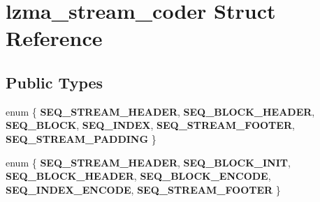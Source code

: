 \section{lzma\+\_\+stream\+\_\+coder Struct Reference}
\label{structlzma__stream__coder}
\subsection*{Public Types}
\begin{DoxyCompactItemize}
\item 
\mbox{\label{structlzma__stream__coder_ae6d6650b05a55ea7f17ca56fd8ce5d46}} 
enum \{ \newline
{\bfseries S\+E\+Q\+\_\+\+S\+T\+R\+E\+A\+M\+\_\+\+H\+E\+A\+D\+ER}, 
{\bfseries S\+E\+Q\+\_\+\+B\+L\+O\+C\+K\+\_\+\+H\+E\+A\+D\+ER}, 
{\bfseries S\+E\+Q\+\_\+\+B\+L\+O\+CK}, 
{\bfseries S\+E\+Q\+\_\+\+I\+N\+D\+EX}, 
\newline
{\bfseries S\+E\+Q\+\_\+\+S\+T\+R\+E\+A\+M\+\_\+\+F\+O\+O\+T\+ER}, 
{\bfseries S\+E\+Q\+\_\+\+S\+T\+R\+E\+A\+M\+\_\+\+P\+A\+D\+D\+I\+NG}
 \}
\item 
\mbox{\label{structlzma__stream__coder_ab12ea2d954838911ba52f012136299be}} 
enum \{ \newline
{\bfseries S\+E\+Q\+\_\+\+S\+T\+R\+E\+A\+M\+\_\+\+H\+E\+A\+D\+ER}, 
{\bfseries S\+E\+Q\+\_\+\+B\+L\+O\+C\+K\+\_\+\+I\+N\+IT}, 
{\bfseries S\+E\+Q\+\_\+\+B\+L\+O\+C\+K\+\_\+\+H\+E\+A\+D\+ER}, 
{\bfseries S\+E\+Q\+\_\+\+B\+L\+O\+C\+K\+\_\+\+E\+N\+C\+O\+DE}, 
\newline
{\bfseries S\+E\+Q\+\_\+\+I\+N\+D\+E\+X\+\_\+\+E\+N\+C\+O\+DE}, 
{\bfseries S\+E\+Q\+\_\+\+S\+T\+R\+E\+A\+M\+\_\+\+F\+O\+O\+T\+ER}
 \}
\end{DoxyCompactItemize}
